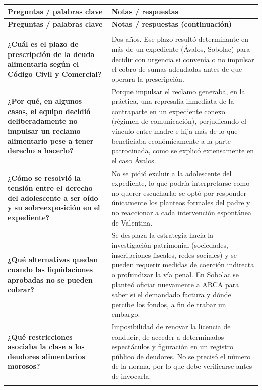 \documentclass[12pt,oneside]{book}
\begin{document}
\begin{longtable}{>{\raggedright\arraybackslash}p{} >{\raggedright\arraybackslash}p{}}
\toprule
\textbf{Preguntas / palabras clave} & \textbf{Notas / respuestas} \\
\midrule
\endfirsthead
\toprule
\textbf{Preguntas / palabras clave} & \textbf{Notas / respuestas (continuación)} \\
\midrule
\endhead
\midrule
\multicolumn{2}{r}{\small\itshape continúa en la página siguiente} \\
\endfoot
\bottomrule
\endlastfoot

\textbf{¿Cuál es el plazo de prescripción de la deuda alimentaria según el Código Civil y Comercial?} &
Dos años. Ese plazo resultó determinante en más de un expediente (Ávalos, Sobolac) para decidir con urgencia si convenía o no impulsar el cobro de sumas adeudadas antes de que operara la prescripción. \\
\addlinespace

\textbf{¿Por qué, en algunos casos, el equipo decidió deliberadamente no impulsar un reclamo alimentario pese a tener derecho a hacerlo?} &
Porque impulsar el reclamo generaba, en la práctica, una represalia inmediata de la contraparte en un expediente conexo (régimen de comunicación), perjudicando el vínculo entre madre e hija más de lo que beneficiaba económicamente a la parte patrocinada, como se explicó extensamente en el caso Ávalos. \\
\addlinespace

\textbf{¿Cómo se resolvió la tensión entre el derecho del adolescente a ser oído y su sobreexposición en el expediente?} &
No se pidió excluir a la adolescente del expediente, lo que podría interpretarse como no querer escucharla; se optó por responder únicamente los planteos formales del padre y no reaccionar a cada intervención espontánea de Valentina. \\
\addlinespace

\textbf{¿Qué alternativas quedan cuando las liquidaciones aprobadas no se pueden cobrar?} &
Se desplaza la estrategia hacia la investigación patrimonial (sociedades, inscripciones fiscales, redes sociales) y se pueden requerir medidas de coerción indirecta o profundizar la vía penal. En Sobolac se planteó oficiar nuevamente a ARCA para saber si el demandado factura y dónde percibe los fondos, a fin de trabar un embargo. \\
\addlinespace

\textbf{¿Qué restricciones asociaba la clase a los deudores alimentarios morosos?} &
Imposibilidad de renovar la licencia de conducir, de acceder a determinados espectáculos y figuración en un registro público de deudores. No se precisó el número de la norma, por lo que debe verificarse antes de invocarla. \\
\addlinespace


\end{longtable}
\end{document}
